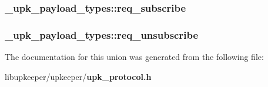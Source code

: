 \subsubsection[{req\_\-subscribe}]{ {\bf \_\-upk\_\-payload\_\-types::req\_\-subscribe}}\label{union__upk__payload__types_a5b88e06488f6a6b32f3173071fe3d5a0}
\subsubsection[{req\_\-unsubscribe}]{ {\bf \_\-upk\_\-payload\_\-types::req\_\-unsubscribe}}\label{union__upk__payload__types_aa40a745f243b9efe2c32284a2e5c0707}


The documentation for this union was generated from the following file:\begin{DoxyCompactItemize}
\item 
libupkeeper/upkeeper/{\bf upk\_\-protocol.h}\end{DoxyCompactItemize}
